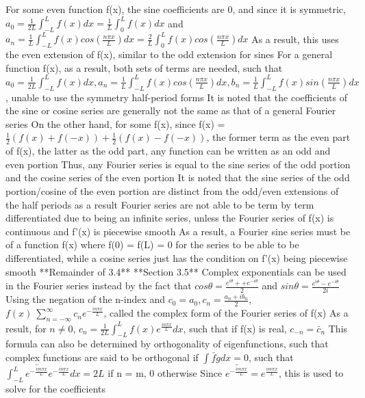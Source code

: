 \documentclass[11 pt, twoside]{article}
\newenvironment{outline*}
{
	\begin{outline}[enumerate]
	}
	{\end{outline}
}
\begin{document}
\begin{outline*}
\1 For some even function f(x), the sine coefficients are 0, and since it is symmetric, $a_0 = \frac{1}{2L} \int^L_{-L} f(x)dx = \frac{1}{L} \int^L_0 f(x)dx$ and $a_n = \frac{1}{L} \int^L_{-L} f(x)cos(\frac{n\pi x}{L})dx = \frac{2}{L} \int^L_0 f(x)cos(\frac{n\pi x}{L})dx$
	\2 As a result, this uses the even extension of f(x), similar to the odd extension for sines
\1 For a general function f(x), as a result, both sets of terms are needed, such that $a_0 = \frac{1}{2L}\int^L_{-L} f(x)dx, a_n = \frac{1}{L} \int^L_{-L} f(x) cos(\frac{n\pi x}{L})dx, b_n = \frac{1}{L} \int^L_{-L} f(x) sin(\frac{n\pi x}{L})dx$, unable to use the symmetry half-period forms
	\2 It is noted that the coefficients of the sine or cosine series are generally not the same as that of a general Fourier series
	\2 On the other hand, for some f(x), since f(x) = $\frac{1}{2}(f(x) + f(-x)) + \frac{1}{2}(f(x) - f(-x))$, the former term as the even part of f(x), the latter as the odd part, any function can be written as an odd and even portion
		\3 Thus, any Fourier series is equal to the sine series of the odd portion and the cosine series of the even portion
		\3 It is noted that the sine series of the odd portion/cosine of the even portion are distinct from the odd/even extensions of the half periods as a result
\1 Fourier series are not able to be term by term differentiated due to being an infinite series, unless the Fourier series of f(x) is continuous and f'(x) is piecewise smooth
	\2 As a result, a Fourier sine series must be of a function f(x) where f(0) = f(L) = 0 for the series to be able to be differentiated, while a cosine series just has the condition on f'(x) being piecewise smooth
	\2 **Remainder of 3.4**
\1 **Section 3.5**
\1 Complex exponentials can be used in the Fourier series instead by the fact that $cos\theta = \frac{e^{i\theta} + +e^{-i\theta}}{2}$ and $sin\theta = \frac{e^{i\theta} - e^{-i\theta}}{2i}$
	\2 Using the negation of the n-index and $c_0 = a_0, c_n = \frac{a_n + ib_n}{2}$, $f(x) ~ \sum_{n = -\infty}^{\infty} c_n e^{-\frac{in\pi x}{L}}$, called the complex form of the Fourier series of f(x)
	\2 As a result, for $n \neq 0$, $c_n = \frac{1}{2L} \int^L_{-L} f(x)e^{\frac{in\pi x}{L}}dx$, such that if f(x) is real, $c_{-n} = \bar{c}_n$
		\3 This formula can also be determined by orthogonality of eigenfunctions, such that complex functions are said to be orthogonal if $\int \bar{f}gdx = 0$, such that $\int^L_{-L} \bar{e^{-\frac{im\pi x}{L}}} e^{-\frac{in\pi x}{L}}dx = 2L$ if n = m, 0 otherwise
		\3 Since $\bar{e^{-\frac{im\pi x}{L}}} = e^{\frac{im\pi x}{L}}$, this is used to solve for the coefficients
\end{outline*}
\end{document}
